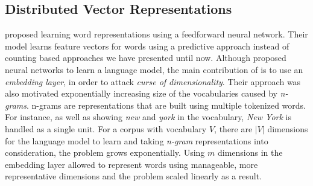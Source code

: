\subsection{Distributed Vector Representations}%
\label{sub:distributed_vector_representations}



\textcite{bengioneural2003} proposed learning word representations using a feedforward neural network.
Their model learns feature vectors for words using a predictive approach instead of counting based approaches we have presented until now.
Although \textcite{xu_can_2000} proposed neural networks to learn a language model, the main contribution of \citeauthor{bengioneural2003} is to use an \emph{embedding layer}, in order to attack \emph{curse of dimensionality}.
Their approach was also motivated exponentially increasing size of the vocabularies caused by \emph{n-grams}.
n-grams are representations that are built using multiple tokenized words.
For instance, as well as showing \emph{new} and \emph{york} in the vocabulary, \emph{New York} is handled as a single unit.
For a corpus with vocabulary $V$, there are $|V|$ dimensions for the language model to learn and taking \emph{n-gram} representations into consideration, the problem grows exponentially.
Using $m$ dimensions in the embedding layer allowed \citeauthor{bengioneural2003} to represent words using manageable, more representative dimensions and the problem scaled linearly as a result.

